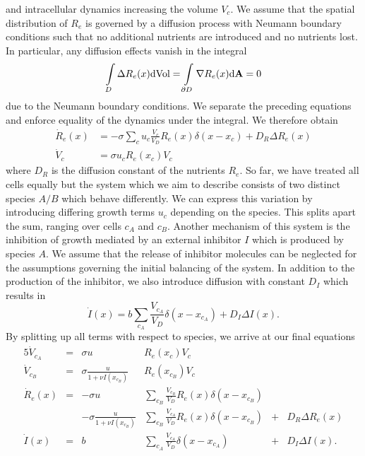 and intracellular dynamics increasing the volume $V_c$.
We assume that the spatial distribution of $R_e$ is governed by a diffusion process with
Neumann boundary conditions such that no additional nutrients are introduced and no nutrients lost.
In particular, any diffusion effects vanish in the integral
\begin{equation}
    \int\limits_D\Delta R_e(x)\text{dVol} = \int\limits_{\partial D}\nabla
    R_e(x)\text{d\textbf{A}} = 0
\end{equation}
due to the Neumann boundary conditions.
We separate the preceding equations and enforce equality of the dynamics under the integral.
We therefore obtain
\begin{align}
    \dot{R}_e(x) &= -\sigma\sum\limits_c u_c\frac{V_c}{V_D}R_e(x)\delta(x-x_c) + D_R\Delta R_e(x)\\
    \dot{V}_c &= \sigma u_c R_e(x_c)V_c
\end{align}
where $D_R$ is the diffusion constant of the nutrients $R_e$.
So far, we have treated all cells equally but the system which we aim to describe
consists of two distinct species $A/B$ which behave differently.
We can express this variation by introducing differing growth terms $u_c$ depending on the species.
This splits apart the sum, ranging over cells $c_A$ and $c_B$.
Another mechanism of this system is the inhibition of growth mediated by an external
inhibitor $I$ which is produced by species $A$.
We assume that the release of inhibitor molecules can be neglected for the assumptions
governing the initial balancing of the system.
In addition to the production of the inhibitor, we also introduce diffusion with constant
$D_I$ which results in
\begin{equation}
    \dot{I}(x) = b\sum\limits_{c_A}\frac{V_{c_A}}{V_D}\delta(x-x_{c_A}) + D_I \Delta I(x).
\end{equation}
By splitting up all terms with respect to species, we arrive at our final equations
\begin{alignat}{5}
    \dot{V}_{c_A} &= &\sigma u& R_e(x_c)V_c\\
    \dot{V}_{c_B} &= &\sigma \frac{u}{1+\nu I(x_{c_B})}&R_e(x_{c_B})V_c\\
    \dot{R}_e(x) &=
    &-\sigma u&\sum\limits_{c_B}\frac{V_{c_B}}{V_D}R_e(x)\delta(x-x_{c_B})\\
    &&-\sigma\frac{u}{1+\nu I(x_{c_B})}&\sum\limits_{c_B}
    \frac{V_{c_A}}{V_D}R_e(x)\delta(x-x_{c_B}) &+& D_R\Delta R_e(x)\\
    \dot{I}(x) &= &b&\sum\limits_{c_A}\frac{V_{c_A}}{V_D}\delta(x-x_{c_A}) &+& D_I \Delta I(x).
\end{alignat}

